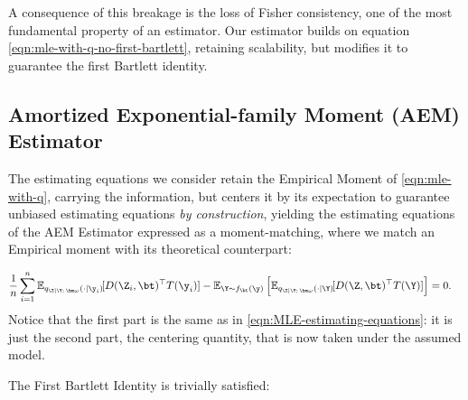 \noindent
A consequence of this breakage is the loss of Fisher consistency, one of the most fundamental property of an estimator. Our estimator builds on equation \eqref{eqn:mle-with-q-no-first-bartlett}, retaining scalability,  but modifies it to guarantee the first Bartlett identity. 

\subsection{Amortized Exponential-family Moment (AEM) Estimator}
\label{subsec:sme}

The estimating equations we consider retain the Empirical Moment of \eqref{eqn:mle-with-q}, carrying the information, but centers it by its expectation to guarantee unbiased estimating equations \textit{by construction}, yielding the estimating equations of the AEM Estimator expressed as a moment-matching, where we match an Empirical moment with its theoretical counterpart:

\begin{align}
\frac{1}{n}\sum_{i=1}^n
\mathbb{E}_{q_{\Z\mid\Y;\,\bm\omega}(\cdot\mid \y_i)}
\![ D(\Z_i,\bt)^\top T(\y_i) ]
-
\mathbb{E}_{\Y\sim f_\bt(\y)}\left[
    \mathbb{E}_{q_{\Z\mid\Y;\,\bm\omega}(\cdot\mid \Y)}
    \![ D(\Z,\bt)^\top T(\Y)]
\right]
&= 0.
\label{eqn:sme-estimating-equations}
\end{align}
\noindent
Notice that the first part is the same as in \eqref{eqn:MLE-estimating-equations}: it is just the second part, the centering quantity, that is now taken under the assumed model.

\iffalse
The First Bartlett Identity is trivially satisfied:

